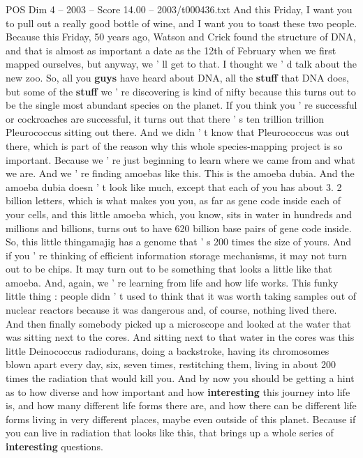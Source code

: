 \begin{textsample}{POS Dim 4 – 2003 – Score 14.00 – 2003/t000436.txt}
And this Friday, I want you to pull out a really good bottle of wine, and I want you to toast these two people.
Because this Friday, 50 years ago, Watson and Crick found the structure of DNA, and that is almost as important a date as the 12th of February when we first mapped ourselves, but anyway, we ' ll get to that.
I thought we ' d talk about the new zoo.
So, all you \textbf{guys} have heard about DNA, all the \textbf{stuff} that DNA does, but some of the \textbf{stuff} we ' re discovering is kind of nifty because this turns out to be the single most abundant species on the planet.
If you think you ' re successful or cockroaches are successful, it turns out that there ' s ten trillion trillion Pleurococcus sitting out there.
And we didn ' t know that Pleurococcus was out there, which is part of the reason why this whole species-mapping project is so important.
Because we ' re just beginning to learn where we came from and what we are.
And we ' re finding amoebas like this.
This is the amoeba dubia.
And the amoeba dubia doesn ' t look like much, except that each of you has about 3. 2 billion letters, which is what makes you you, as far as gene code inside each of your cells, and this little amoeba which, you know, sits in water in hundreds and millions and billions, turns out to have 620 billion base pairs of gene code inside.
So, this little thingamajig has a genome that ' s 200 times the size of yours.
And if you ' re thinking of efficient information storage mechanisms, it may not turn out to be chips.
It may turn out to be something that looks a little like that amoeba.
And, again, we ' re learning from life and how life works.
This funky little thing : people didn ' t used to think that it was worth taking samples out of nuclear reactors because it was dangerous and, of course, nothing lived there.
And then finally somebody picked up a microscope and looked at the water that was sitting next to the cores.
And sitting next to that water in the cores was this little Deinococcus radiodurans, doing a backstroke, having its chromosomes blown apart every day, six, seven times, restitching them, living in about 200 times the radiation that would kill you.
And by now you should be getting a hint as to how diverse and how important and how \textbf{interesting} this journey into life is, and how many different life forms there are, and how there can be different life forms living in very different places, maybe even outside of this planet.
Because if you can live in radiation that looks like this, that brings up a whole series of \textbf{interesting} questions.

\end{textsample}

